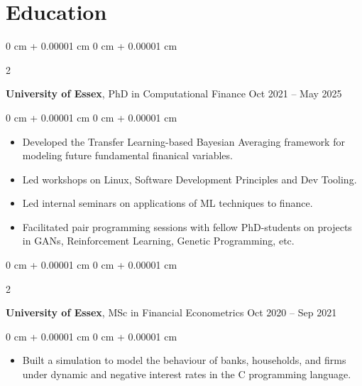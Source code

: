\documentclass[10pt, letterpaper]{article}
\newenvironment{highlights}{
    \begin{itemize}[
        topsep=0.10 cm,
        parsep=0.10 cm,
        partopsep=0pt,
        itemsep=0pt,
        leftmargin=0 cm + 10pt
    ]
}{
    \end{itemize}
} %
\newenvironment{onecolentry}{
    \begin{adjustwidth}{
        0 cm + 0.00001 cm
    }{
        0 cm + 0.00001 cm
    }
}{
    \end{adjustwidth}
} %
\newenvironment{twocolentry}[2][]{
    \onecolentry
    \def\secondColumn{#2}
    \setcolumnwidth{\fill, 4.5 cm}
    \begin{paracol}{2}
}{
    \switchcolumn \raggedleft \secondColumn
    \end{paracol}
    \endonecolentry
} %
\begin{document}
    \section{Education}

        \begin{twocolentry}{
            Oct 2021 – May 2025
        }
            \textbf{University of Essex}, PhD in Computational Finance\end{twocolentry}

        \vspace{0.10 cm}
        \begin{onecolentry}
            \begin{highlights}
            \item Developed the Transfer Learning-based Bayesian Averaging framework for modeling future fundamental finanical variables.
                \item Led workshops on Linux, Software Development Principles and Dev Tooling.
                \item Led internal seminars on applications of ML techniques to finance.
                \item Facilitated pair programming sessions with fellow PhD-students on projects in GANs, Reinforcement Learning, Genetic Programming, etc.
            \end{highlights}
        \end{onecolentry}

    
        \begin{twocolentry}{
            Oct 2020 – Sep 2021 
        }
            \textbf{University of Essex}, MSc in Financial Econometrics\end{twocolentry}

        \vspace{0.10 cm}
        \begin{onecolentry}
            \begin{highlights}
            \item Built a simulation to model the behaviour of banks, households, and firms under dynamic and negative interest rates in the C programming language.
            \end{highlights}
        \end{onecolentry}
\end{document}
